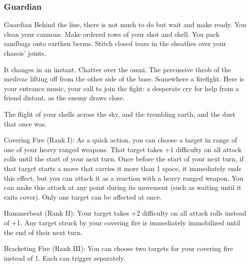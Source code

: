 \subsubsection{Guardian}


                                                    Guardian
Behind the line, there is not much to do but wait and make ready. You clean your cannons. Make
ordered rows of your shot and shell. You pack sandbags onto earthen berms. Stitch closed tears
in the sheathes over your chassis’ joints.

It changes in an instant. Chatter over the omni. The percussive throb of the medivac lifting off
from the other side of the base. Somewhere a firefight. Here is your entrance music, your call to
join the fight: a desperate cry for help from a friend distant, as the enemy draws close.

 The flight of your shells across the sky, and the trembling earth, and the dust that once was.

Covering Fire (Rank I): As a quick action, you can choose a target in range of one of your heavy
ranged weapons. That target takes +1 difficulty on all attack rolls until the start of your next turn.
Once before the start of your next turn, if that target starts a move that carries it more than 1
space, it immediately ends this effect, but you can attack it as a reaction with a heavy ranged
weapon. You can make this attack at any point during its movement (such as waiting until it exits
cover). Only one target can be affected at once.

 Hammerbeat (Rank II): Your target takes +2 difficulty on all attack rolls instead of +1. Any target
struck by your covering fire is immediately immobilized until the end of their next turn.

 Bracketing Fire (Rank III): You can choose two targets for your covering fire instead of 1. Each
can trigger separately.